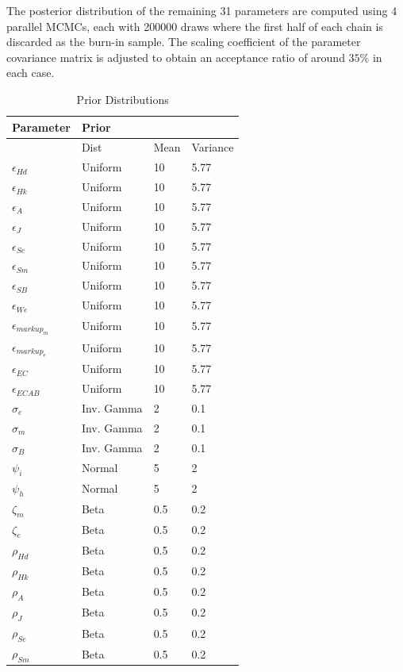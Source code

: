 \documentclass[12pt]{article}
\numberwithin{equation}{section}
\begin{document}
The posterior distribution of the remaining 31 parameters are computed using 4 parallel MCMCs, each with 200000 draws where the first half of each chain is discarded as the burn-in sample. The scaling coefficient of the parameter covariance matrix is adjusted to obtain an acceptance ratio of around $35\%$ in each case. 

 
\begin{table}[H]
\caption{Prior Distributions}
\begin{tabular}{l|l|l|l}
Parameter & Prior &  &  \\
\hline
\hline
 & Dist & Mean & Variance \\
 \hline
\hline
$\epsilon_{Hd}$ & Uniform & 10 & 5.77 \\
$\epsilon_{Hk}$ & Uniform & 10 & 5.77 \\
$\epsilon_{A}$ & Uniform & 10 & 5.77 \\
$\epsilon_{J}$ & Uniform & 10 & 5.77 \\
$\epsilon_{Se}$ & Uniform & 10 & 5.77 \\
$\epsilon_{Sm}$ & Uniform & 10 & 5.77 \\
$\epsilon_{SB}$ & Uniform & 10 & 5.77 \\
$\epsilon_{We}$ & Uniform & 10 & 5.77 \\
$\epsilon_{markup_m}$ & Uniform & 10 & 5.77 \\
$\epsilon_{markup_e}$ & Uniform & 10 & 5.77 \\
$\epsilon_{EC}$ & Uniform & 10 & 5.77 \\
$\epsilon_{ECAB}$ & Uniform & 10 & 5.77 \\
$\sigma_e$ & Inv. Gamma & 2 & 0.1 \\
$\sigma_m$ & Inv. Gamma & 2 & 0.1 \\
$\sigma_B$ & Inv. Gamma & 2 & 0.1 \\
$\psi_i$ & Normal & 5 & 2 \\
$\psi_h$ & Normal & 5 & 2 \\
$\zeta_m$ & Beta & 0.5 & 0.2 \\
$\zeta_e$ & Beta & 0.5 & 0.2 \\
$\rho_{Hd}$ & Beta & 0.5 & 0.2 \\
$\rho_{Hk}$ & Beta & 0.5 & 0.2 \\
$\rho_{A}$ & Beta & 0.5 & 0.2 \\
$\rho_{J}$ & Beta & 0.5 & 0.2 \\
$\rho_{Se}$ & Beta & 0.5 & 0.2 \\
$\rho_{Sm}$ & Beta & 0.5 & 0.2 \\

\end{tabular}
\end{table}
\end{document}
